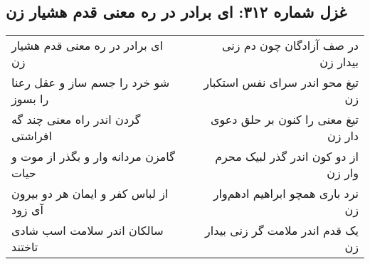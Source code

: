 \begin{center}
\section*{غزل شماره ۳۱۲: ای برادر در ره معنی قدم هشیار زن}
\label{sec:312}
\begin{longtable}{l p{0.5cm} r}
ای برادر در ره معنی قدم هشیار زن
&&
در صف آزادگان چون دم زنی بیدار زن
\\
شو خرد را جسم ساز و عقل رعنا را بسوز
&&
تیغ محو اندر سرای نفس استکبار زن
\\
گردن اندر راه معنی چند گه افراشتی
&&
تیغ معنی را کنون بر حلق دعوی دار زن
\\
گامزن مردانه وار و بگذر از موت و حیات
&&
از دو کون اندر گذر لبیک محرم وار زن
\\
از لباس کفر و ایمان هر دو بیرون آی زود
&&
نرد باری همچو ابراهیم ادهم‌وار زن
\\
سالکان اندر سلامت اسب شادی تاختند
&&
یک قدم اندر ملامت گر زنی بیدار زن
\\
\end{longtable}
\end{center}
